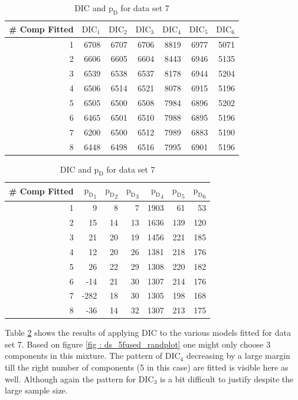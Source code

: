 \begin{table}[!htb]
\centering
\caption{DIC and $\text{p}_\text{D}$ for data set 7}
\label{table : ds_5fused_dic}
\begin{tabular}{@{}rrrrrrr@{}}
\toprule
\# Comp Fitted & $\text{DIC}_1$ & $\text{DIC}_2$  & $\text{DIC}_3$  & $\text{DIC}_4$  & $\text{DIC}_5$  & $\text{DIC}_6$  \\ \midrule
1 & 6708 & 6707 & 6706 & 8819 & 6977 & 5071 \\
2 & 6606 & 6605 & 6604 & 8443 & 6946 & 5135 \\
3 & 6539 & 6538 & 6537 & 8178 & 6944 & 5204 \\
4 & 6506 & 6514 & 6521 & 8078 & 6915 & 5196 \\
5 & 6505 & 6500 & 6508 & 7984 & 6896 & 5202 \\
6 & 6465 & 6501 & 6510 & 7988 & 6895 & 5196 \\
7 & 6200 & 6500 & 6512 & 7989 & 6883 & 5190 \\
8 & 6448 & 6498 & 6516 & 7995 & 6901 & 5196 \\ \bottomrule
\end{tabular}

\begin{tabular}{@{}rrrrrrr@{}}
\toprule
\# Comp Fitted & ${\text{p}_\text{D}}_1$ & ${\text{p}_\text{D}}_2$ & ${\text{p}_\text{D}}_3$ & ${\text{p}_\text{D}}_4$ & ${\text{p}_\text{D}}_5$ & ${\text{p}_\text{D}}_6$ \\ \midrule
1 & 9 & 8 & 7 & 1903 & 61 & 53 \\
2 & 15 & 14 & 13 & 1636 & 139 & 120 \\
3 & 21 & 20 & 19 & 1456 & 221 & 185 \\
4 & 12 & 20 & 26 & 1381 & 218 & 176 \\
5 & 26 & 22 & 29 & 1308 & 220 & 182 \\
6 & -14 & 21 & 30 & 1307 & 214 & 176 \\
7 & -282 & 18 & 30 & 1305 & 198 & 168 \\
8 & -36 & 14 & 32 & 1307 & 213 & 175 \\ \bottomrule
\end{tabular}
\end{table}

Table \ref{table : ds_5fused_dic} shows the results of applying DIC to the various models fitted for data set 7. Based on figure \ref{fig : ds_5fused_randplot} one might only choose 3 components in this mixture. The pattern of $\text{DIC}_4$ decreasing by a large margin till the right number of components (5 in this case) are fitted is visible here as well. Although again the pattern for $\text{DIC}_3$ is a bit difficult to justify despite the large sample size.

